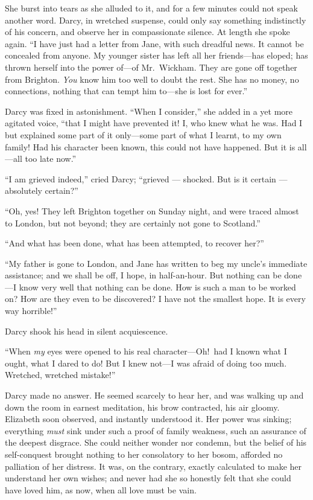 \documentclass[12pt,english,oneside]{book}
\begin{document}
She burst into tears as she alluded to it, and for a few minutes could
not speak another word. Darcy, in wretched suspense, could only say
something indistinctly of his concern, and observe her in compassionate
silence. At length she spoke again. {}``I have just had a letter
from Jane, with such dreadful news. It cannot be concealed from anyone.
My younger sister has left all her friends\mbox{---}has eloped; has
thrown herself into the power of\mbox{---}of Mr.\ Wickham. They
are gone off together from Brighton. \textit{You} know him too well
to doubt the rest. She has no money, no connections, nothing that
can tempt him to\mbox{---}she is lost for ever.''

Darcy was fixed in astonishment. {}``When I consider,'' she added
in a yet more agitated voice, {}``that I might have prevented it!
I, who knew what he was. Had I but explained some part of it only\mbox{---}some
part of what I learnt, to my own family! Had his character been known,
this could not have happened. But it is all\mbox{---}all too late
now.''

{}``I am grieved indeed,'' cried Dar\-cy; {}``grieved \mbox{---}
shocked. But is it certain \mbox{---} absolutely certain?''\ 

{}``Oh, yes! They left Brighton together on Sunday night, and were
traced almost to London, but not beyond; they are certainly not gone
to Scotland.''

{}``And what has been done, what has been attempted, to recover her?''\ 

{}``My father is gone to London, and Jane has written to beg my uncle's
immediate assistance; and we shall be off, I hope, in half-an-hour.
But nothing can be done\mbox{---}I know very well that nothing can
be done. How is such a man to be worked on? How are they even to be
discovered? I have not the smallest hope. It is every way horrible!''\ 

Darcy shook his head in silent acquiescence.

{}``When \textit{my} eyes were opened to his real character\mbox{---}Oh!\ had
I known what I ought, what I dared to do! But I knew not\mbox{---}I
was afraid of doing too much. Wretched, wretched mistake!''\ 

Darcy made no answer. He seemed scarcely to hear her, and was walking
up and down the room in earnest meditation, his brow contracted, his
air gloomy. Elizabeth soon observed, and instantly understood it.
Her power was sinking; everything \textit{must} sink under such a
proof of family weakness, such an assurance of the deepest disgrace.
She could neither wonder nor condemn, but the belief of his self-conquest
brought nothing to her consolatory to her bosom, afforded no palliation
of her distress. It was, on the contrary, exactly calculated to make
her understand her own wishes; and never had she so honestly felt
that she could have loved him, as now, when all love must be vain.
\end{document}

